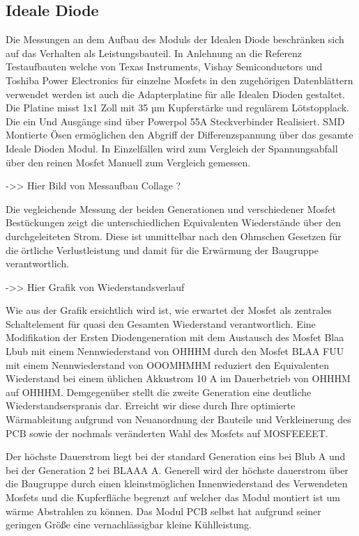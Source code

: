 \subsection{Ideale Diode}

Die Messungen an dem Aufbau des Moduls der Idealen Diode beschränken sich auf das Verhalten als Leistungsbauteil. 
In Anlehnung an die Referenz Testaufbauten welche von Texas Instruments, Vishay Semiconductors und Toshiba Power Electronics für einzelne Mosfets in den zugehörigen Datenblättern verwendet werden ist auch die Adapterplatine für alle Idealen Dioden gestaltet.
Die Platine misst 1x1 Zoll mit 35 µm Kupferstärke und regulärem Lötstopplack. Die ein Und Ausgänge sind über Powerpol 55A Steckverbinder Realisiert. SMD Montierte Ösen ermöglichen den Abgriff der Differenzspannung über das gesamte Ideale Dioden Modul. In Einzelfällen wird zum Vergleich der Spannungsabfall über den reinen Mosfet Manuell zum Vergleich gemessen.

->> Hier Bild von Messaufbau  Collage ?


Die vegleichende Messung der beiden Generationen und verschiedener Mosfet Bestückungen zeigt die unterschiedlichen Equivalenten Wiederstände über den durchgeleiteten Strom.
Diese ist unmittelbar nach den Ohmschen Gesetzen für die örtliche Verlustleistung und damit für die Erwärmung der Baugruppe verantwortlich.


->> Hier Grafik von Wiederstandsverlauf

Wie aus der Grafik ersichtlich wird ist, wie erwartet der Mosfet als zentrales Schaltelement für quasi den Gesamten Wiederstand verantwortlich.
Eine Modifikation der Ersten Diodengeneration mit dem Austausch des Mosfet  Blaa Lbub  mit einem Nennwiederstand von OHHHM durch den Mosfet  BLAA FUU mit einem Nennwiederstand von OOOMHMHM  reduziert den Equivalenten Wiederstand bei einem üblichen Akkustrom 10 A im Dauerbetrieb von OHHHM  auf OHHHM.
Demgegenüber stellt die zweite Generation eine deutliche Wiederstandserspranis dar.
Erreicht wir diese durch Ihre optimierte Wärmableitung aufgrund von Neuanordnung der Bauteile und Verkleinerung des PCB sowie der nochmals veränderten Wahl des Mosfets auf MOSFEEEET.

Der höchste Dauerstrom liegt bei der standard Generation eins bei  Blub A  und bei der Generation 2 bei BLAAA A. 
Generell wird der höchste dauerstrom über die Baugruppe durch einen kleinstmöglichen Innenwiederstand des Verwendeten Mosfets und die Kupferfläche begrenzt auf welcher das Modul montiert ist um wärme Abstrahlen zu können. Das Modul PCB selbst hat aufgrund seiner geringen Größe eine vernachlässigbar kleine Kühlleistung.

